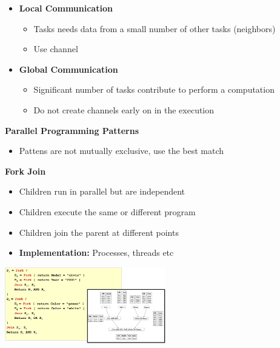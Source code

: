 \documentclass[10pt, landscape]{article}
\begin{document}
\begin{multicols}{4}
\begin{enumerate}
\begin{itemize}
        \item \textbf{Local Communication}
        \begin{itemize}
            \item Tasks needs data from a small number of other tasks (neighbors)
            \item Use channel 
        \end{itemize}
        \item \textbf{Global Communication}
        \begin{itemize}
            \item Significant number of tasks contribute to perform a computation
            \item Do not create channels early on in the execution
        \end{itemize}
    \end{itemize}
\end{enumerate}



\textbf{Parallel Programming Patterns}
\begin{itemize}
    \item Pattens are not mutually exclusive, use the best match 
\end{itemize}

\textbf{Fork Join}
\begin{itemize}
    \item Children run in parallel but are independent 
    \item Children execute the same or different program 
    \item Children join the parent at different points 
    \item \textbf{Implementation: } Processes, threads etc
\end{itemize}

\includegraphics*[width=7cm]{db_fj}


\end{multicols}
\end{document}
